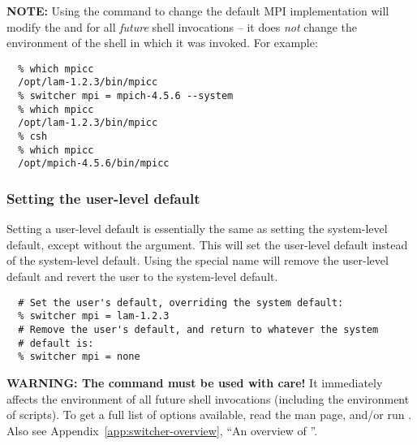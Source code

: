 {\bf NOTE:} Using the  command to change the default MPI
implementation will modify the  and  for all
{\em future} shell invocations -- it does {\em not} change the
environment of the shell in which it was invoked.  For example:

\begin{verbatim}
  % which mpicc
  /opt/lam-1.2.3/bin/mpicc
  % switcher mpi = mpich-4.5.6 --system
  % which mpicc
  /opt/lam-1.2.3/bin/mpicc
  % csh
  % which mpicc
  /opt/mpich-4.5.6/bin/mpicc
\end{verbatim}

\subsubsection{Setting the user-level default}

Setting a user-level default is essentially the same as setting the
system-level default, except without the  argument.
This will set the user-level default instead of the system-level
default.  Using the special name  will remove the user-level
default and revert the user to the system-level default.

\begin{verbatim}
  # Set the user's default, overriding the system default:
  % switcher mpi = lam-1.2.3
  # Remove the user's default, and return to whatever the system
  # default is:
  % switcher mpi = none
\end{verbatim}

{\bf WARNING: The  command must be used with care!}  It
immediately affects the environment of all future shell invocations
(including the environment of scripts).  To get a full list of options
available, read the  man page, and/or run
.  Also see Appendix~\ref{app:switcher-overview},
``An overview of ''.
